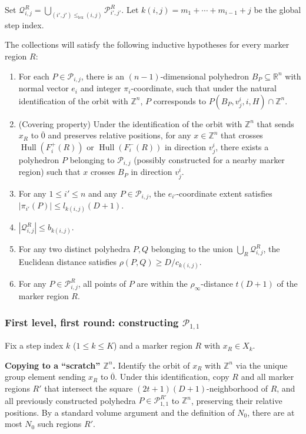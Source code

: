 \documentclass{amsart}
\theoremstyle{definition}
\DeclareMathOperator{\Hull}{Hull}
\begin{document}
Set
$\mathcal{Q}_{i,j}^R=
\bigcup_{(i',j')\leq_{\text{lex}}(i,j)}\mathcal{P}_{i',j'}^R$.
Let $k(i,j)=m_1+\cdots+m_{i-1}+j$ be the global step index.

The collections will satisfy the following inductive hypotheses for every
marker region $R$:

\begin{enumerate}
\item[(I1)] For each $P\in\mathcal{P}_{i,j}$, there is an
$(n-1)$-dimensional polyhedron $B_P\subseteq\mathbb{R}^n$ with normal
vector $e_i$ and integer $\pi_i$-coordinate, such that under the natural
identification of the orbit with $\mathbb{Z}^n$, $P$ corresponds to
$P(B_P, v_j^i, i, H)\cap\mathbb{Z}^n$.

\item[(I2)] (Covering property) Under the identification of the orbit
with $\mathbb{Z}^n$ that sends $x_R$ to $\overline{0}$ and preserves
relative positions, for any $x\in\mathbb{Z}^n$ that crosses
$\Hull(F_i^+(R))$ or $\Hull(F_i^-(R))$ in direction $v_j^i$, there
exists a polyhedron $P$ belonging to $\mathcal{P}_{i,j}$ (possibly
constructed for a nearby marker region) such that $x$ crosses $B_P$ in
direction $v_j^i$.

\item[(I3)] For any $1\leq i'\leq n$ and any $P\in\mathcal{P}_{i,j}$,
the $e_{i'}$-coordinate extent satisfies
$|\pi_{i'}(P)|\leq l_{k(i,j)}(D+1)$.

\item[(I4)] $|\mathcal{Q}_{i,j}^R|\leq b_{k(i,j)}$.

\item[(I5)] For any two distinct polyhedra $P, Q$ belonging to the union
$\bigcup_{R}\mathcal{Q}_{i,j}^R$, the Euclidean
distance satisfies $\rho(P,Q)\geq D/c_{k(i,j)}$.

\item[(I6)] For any $P\in\mathcal{P}_{i,j}^R$, all points of $P$ are
within the $\rho_\infty$-distance $t(D+1)$ of the marker region $R$.
\end{enumerate}

\subsubsection{First level, first round: constructing $\mathcal{P}_{1,1}$}

Fix a step index $k$ ($1\leq k\leq K$) and a marker region $R$ with
$x_R\in X_k$.

\medskip
\noindent\textbf{Copying to a ``scratch'' $\mathbb{Z}^n$.}
Identify the orbit of $x_R$ with $\mathbb{Z}^n$ via the unique group
element sending $x_R$ to $\overline{0}$. Under this identification,
copy $R$ and all marker regions $R'$ that intersect the square
$(2t+1)(D+1)$-neighborhood of $R$, and
all previously constructed polyhedra
$P\in\mathcal{P}_{1,1}^{R'}$ to
$\mathbb{Z}^n$, preserving their relative positions. By a standard volume
argument and the definition of $N_0$, there are at most $N_0$ such
regions $R'$.
\end{document}

